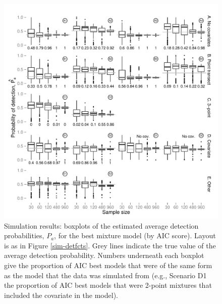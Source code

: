 \documentclass[useAMS,referee,usenatbib]{biom}
\begin{document}
\begin{figure}
\centering
\includegraphics[width=\textwidth]{simulations/pa-plot-mmds.pdf}
\caption{Simulation results: boxplots of the estimated average detection probabilities, $P_a$, for the best mixture model (by AIC score). Layout is as in Figure \ref{sim-detfcts}. Grey lines indicate the true value of the average detection probability. Numbers underneath each boxplot give the proportion of AIC best models that were of the same form as the model that the data was simulated from (e.g., Scenario D1 the proportion of AIC best models that were 2-point mixtures that included the covariate in the model).}
\label{sim-boxplots}
\end{figure}
\end{document}
